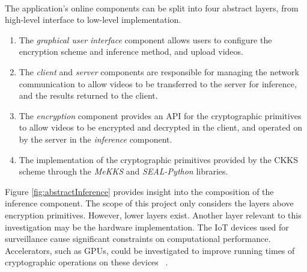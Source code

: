 \smallskip \\ \indent
The application's online components can be split into four abstract layers, from high-level interface to low-level implementation.
\begin{enumerate}
    \item The \textit{graphical user interface} component allows users to configure the encryption scheme and inference method, and upload videos.
    \item The \textit{client} and \textit{server} components are responsible for managing the network communication to allow videos to be transferred to the server for inference, and the results returned to the client.
    \item The \textit{encryption} component provides an API for the cryptographic primitives to allow videos to be encrypted and decrypted in the client, and operated on by the server in the \textit{inference} component.
    \item The implementation of the cryptographic primitives provided by the CKKS scheme through the \textit{MeKKS} and \textit{SEAL-Python} libraries.
\end{enumerate}
\indent
Figure \ref{fig:abstractInference} provides insight into the composition of the inference component. The scope of this project only considers the layers above encryption primitives. However, lower layers exist. Another layer relevant to this investigation may be the hardware implementation. The IoT devices used for surveillance cause significant constraints on computational performance. Accelerators, such as GPUs, could be investigated to improve running times of cryptographic operations on these devices ~\cite{Badawi}.
